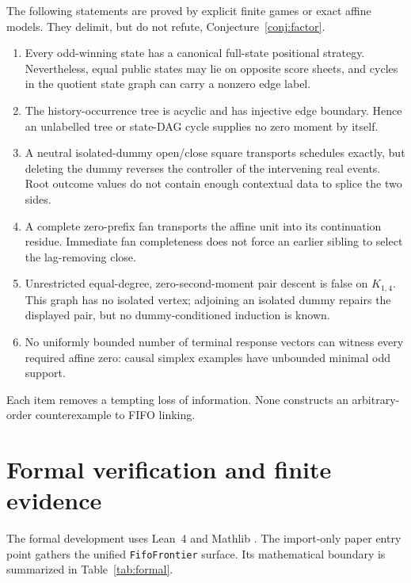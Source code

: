 \documentclass[11pt]{article}
\theoremstyle{definition}
\theoremstyle{remark}
\begin{document}
The following statements are proved by explicit finite games or exact affine
models.  They delimit, but do not refute, Conjecture~\ref{conj:factor}.
\begin{enumerate}
\item Every odd-winning state has a canonical full-state positional strategy.
      Nevertheless, equal public states may lie on opposite score sheets,
      and cycles in the quotient state graph can carry a nonzero edge label.
\item The history-occurrence tree is acyclic and has injective edge boundary.
      Hence an unlabelled tree or state-DAG cycle supplies no zero moment by
      itself.
\item A neutral isolated-dummy open/close square transports schedules exactly,
      but deleting the dummy reverses the controller of the intervening real
      events.  Root outcome values do not contain enough contextual data to
      splice the two sides.
\item A complete zero-prefix fan transports the affine unit into its
      continuation residue.  Immediate fan completeness does not force an
      earlier sibling to select the lag-removing close.
\item Unrestricted equal-degree, zero-second-moment pair descent is false on
      $K_{1,4}$.  This graph has no isolated vertex; adjoining an isolated
      dummy repairs the displayed pair, but no dummy-conditioned induction is
      known.
\item No uniformly bounded number of terminal response vectors can witness
      every required affine zero: causal simplex examples have unbounded
      minimal odd support.
\end{enumerate}
Each item removes a tempting loss of information.  None constructs an
arbitrary-order counterexample to FIFO linking.

\section{Formal verification and finite evidence}\label{sec:evidence}

The formal development uses Lean~4 \cite{demouraullrich2021} and Mathlib
\cite{mathlib2020}.  The import-only paper entry point gathers the unified
\texttt{FifoFrontier} surface.  Its mathematical boundary is summarized in
Table~\ref{tab:formal}.
\end{document}
